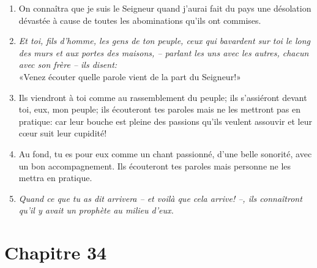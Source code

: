 \begin{enumerate}[leftmargin=\psleftmargin, labelsep = \pslabelsep, label={\arabic*}, font=\color{\pscolor}\small\textsuperscript, parsep=0em, itemsep=0em, topsep=0em ]
  \item {}On connaîtra que je suis le Seigneur \brk
        quand j’aurai fait du pays une désolation dévastée \brk
        à cause de toutes les abominations qu’ils ont commises. \parSpace
  \item {}\textit{Et toi, fils d’homme, \brk
          les gens de ton peuple, ceux qui bavardent sur toi \brk
          le long des murs et aux portes des maisons, \brk
          – parlant les uns avec les autres, chacun avec son frère – \brk
          ils disent:} \\
        «Venez écouter quelle parole vient de la part du Seigneur!»
  \item {}Ils viendront à toi comme au rassemblement du peuple; \brk
        ils s’assiéront devant toi, eux, mon peuple; \brk
        ils écouteront tes paroles mais ne les mettront pas en pratique: \brk
        car leur bouche est pleine des passions qu’ils veulent assouvir \brk
        et leur cœur suit leur cupidité!
  \item {}Au fond, tu es pour eux comme un chant passionné, \brk
        d’une belle sonorité, avec un bon accompagnement. \brk
        Ils écouteront tes paroles mais personne ne les mettra en pratique. \verseSpace
  \item {}\textit{Quand ce que tu as dit arrivera – et voilà que cela arrive! –,\brk
          ils connaîtront qu’il y avait un prophète au milieu d’eux.}
\end{enumerate}
\newpage

\section*{Chapitre 34}
